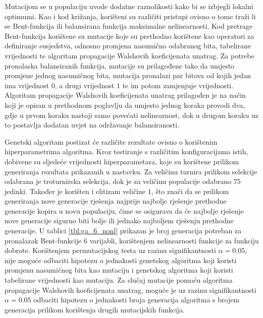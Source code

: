Mutacijom se u populaciju uvode dodatne raznolikosti kako bi se izbjegli lokalni optimumi.
Kao i kod križanja, korišteni su različiti pristupi ovisno o tome traži li se Bent-funkcija ili balansirana funkcija maksimalne nelinearnosti.
Kod pretrage Bent-funkcija korištene su mutacije koje su prethodno korištene kao operatori za definiranje susjedstva, odnosno promjena nasumično odabranog bita, tabelirane vrijednosti te algoritam propagacije Walshovih koeficijenata unatrag.
Za potrebe pronalaska balansiranih funkcija, mutacije su prilagođene tako da umjesto promjene jednog nasumičnog bita, mutacija pronalazi par bitova od kojih jedan ima vrijednost $0$, a drugi vrijednost $1$ te im potom zamjenjuje vrijednosti.
Algoritam propagacije Walshovih koeficijenata unatrag prilagođen je na način koji je opisan u prethodnom poglavlju da umjesto jednog koraka provodi dva, gdje u prvom koraku nastoji samo povećati nelinearnost, dok u drugom koraku uz to postavlja dodatan uvjet na održavanje balansiranosti.

Genetski algoritam postizat će različite rezultate ovisno o korištenim hiperparametrima algoritma.
Kroz testiranje s različitim konfiguracijama istih, dobivene su sljedeće vrijednosti hiperparametara, koje su korištene prilikom generiranja rezultata prikazanih u nastavku.
Za veličinu turnira prilikom selekcije odabrana je troturnirska selekcija, dok je za veličinu populacije odabrano $75$ jedinki.
Također je korišten i elitizam veličine $1$, što znači da se prilikom generiranja nove generacije rješenja najprije najbolje rješenje prethodne generacije kopira u novu populaciju, čime se osigurava da će najbolje rješenje nove generacije sigurno biti bolje ili jednako najboljem rješenju prethodne generacije.
U tablici \ref{tbl:ga_6_nonl} prikazan je broj generacija potreban za pronalazak Bent-funkcije $6$ varijabli, korištenjem nelinearnosti funkcije za funkciju dobrote.
Korištenjem permutacijskog testa uz razinu signifikantnosti $\alpha = 0.05$, nije moguće odbaciti hipotezu o jednakosti genetskog algoritma koji koristi promjenu nasumičnog bita kao mutaciju i genetskog algoritma koji koristi tabelirane vrijednosti kao mutaciju.
Za slučaj mutacije pomoću algoritma propagacije Walshovih koeficijenata unatrag, moguće je uz razinu signifikantnosti $\alpha = 0.05$ odbaciti hipotezu o jednakosti broja generacija algoritma s brojem generacija prilikom korištenja drugih mutacijskih funkcija.

